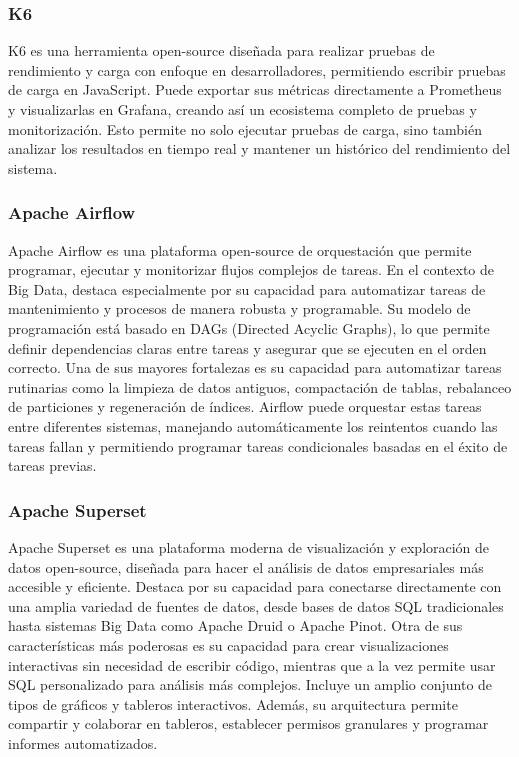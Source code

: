 \subsubsection{K6}
K6 es una herramienta open-source diseñada para realizar pruebas de rendimiento y carga con enfoque en desarrolladores, permitiendo escribir pruebas de carga en JavaScript.
Puede exportar sus métricas directamente a Prometheus y visualizarlas en Grafana, creando así un ecosistema completo de pruebas y monitorización. 
Esto permite no solo ejecutar pruebas de carga, sino también analizar los resultados en tiempo real y mantener un histórico del rendimiento del sistema. 

\subsubsection{Apache Airflow}

Apache Airflow es una plataforma open-source de orquestación que permite programar, ejecutar y monitorizar flujos complejos de tareas. 
En el contexto de Big Data, destaca especialmente por su capacidad para automatizar tareas de mantenimiento y procesos de manera robusta y programable. 
Su modelo de programación está basado en DAGs (Directed Acyclic Graphs), lo que permite definir dependencias claras entre tareas y asegurar que se ejecuten en el orden correcto.
Una de sus mayores fortalezas es su capacidad para automatizar tareas rutinarias como la limpieza de datos antiguos, compactación de tablas, rebalanceo de particiones y regeneración de índices. 
Airflow puede orquestar estas tareas entre diferentes sistemas, manejando automáticamente los reintentos cuando las tareas fallan 
y permitiendo programar tareas condicionales basadas en el éxito de tareas previas.

\subsubsection{Apache Superset}
Apache Superset es una plataforma moderna de visualización y exploración de datos open-source, diseñada para hacer el análisis de datos empresariales más accesible y eficiente. 
Destaca por su capacidad para conectarse directamente con una amplia variedad de fuentes de datos, desde bases de datos SQL tradicionales hasta sistemas Big Data como Apache Druid o Apache Pinot.
Otra de sus características más poderosas es su capacidad para crear visualizaciones interactivas sin necesidad de escribir código, 
mientras que a la vez permite usar SQL personalizado para análisis más complejos. 
Incluye un amplio conjunto de tipos de gráficos y tableros interactivos. 
Además, su arquitectura permite compartir y colaborar en tableros, establecer permisos granulares y programar informes automatizados.
\newpage